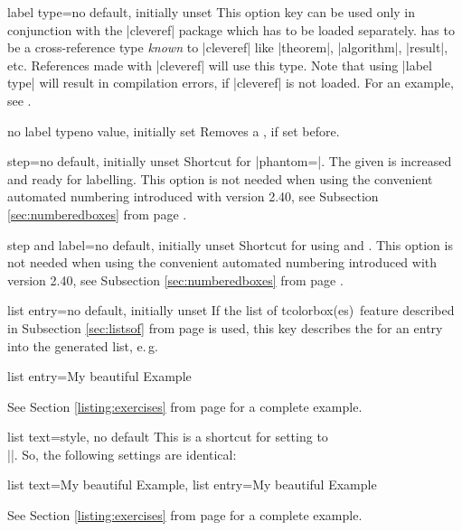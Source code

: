 \begin{docTcbKey}{label type}{=}{no default, initially unset}
This option key can be used only in conjunction with the |cleveref| package
\cite{cubitt:2018a} which has to be loaded separately.
 has to be a cross-reference type \emph{known} to |cleveref|
like |theorem|, |algorithm|, |result|, etc. References made with |cleveref|
will use this type. Note that using |label type| will result in compilation
errors, if |cleveref| is not loaded.
For an example, see .
\end{docTcbKey}

\begin{docTcbKey}{no label type}{}{no value, initially set}
Removes a , if set before.
\end{docTcbKey}

\begin{docTcbKey}{step}{=}{no default, initially unset}
Shortcut for |phantom={}|. The given  is
increased and ready for labelling. This option is not needed when
using the convenient automated numbering introduced with version 2.40,
see Subsection \ref{sec:numberedboxes}
from page \pageref{sec:numberedboxes}.
\end{docTcbKey}

\begin{docTcbKey}{step and label}{=}{no default, initially unset}
Shortcut for using  and . This option is not needed when
using the convenient automated numbering introduced with version 2.40,
see Subsection \ref{sec:numberedboxes}
from page \pageref{sec:numberedboxes}.
\end{docTcbKey}

\clearpage
\begin{docTcbKey}{list entry}{=}{no default, initially unset}
If the \flqq list of tcolorbox(es)\frqq\ feature described in Subsection
\ref{sec:listsof} from page \pageref{sec:listsof} is used, this key
describes the  for an entry into the generated list, e.\,g.
\begin{dispListing}
list entry={\protect\numberline{\thetcbcounter}My beautiful Example}
\end{dispListing}
See Section \ref{listing:exercises} from page \pageref{listing:exercises}
for a complete example.
\end{docTcbKey}

\begin{docTcbKey}[][doc new=2014-09-19]{list text}{=}{style, no default}
This is a shortcut for setting  to\\
|\protect\numberline{\thetcbcounter}|.
So, the following settings are identical:
\begin{dispListing}
list text={My beautiful Example},
list entry={\protect\numberline{\thetcbcounter}My beautiful Example}
\end{dispListing}
See Section \ref{listing:exercises} from page \pageref{listing:exercises}
for a complete example.
\end{docTcbKey}

